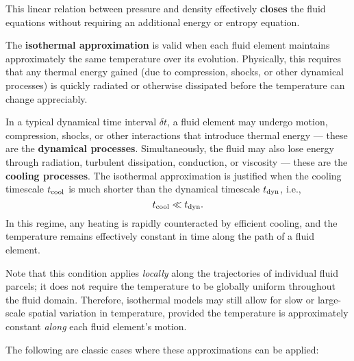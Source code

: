 This linear relation between pressure and density effectively \textbf{closes} the fluid equations without requiring an additional energy or entropy equation.

\vspace{0.3em}
The \textbf{isothermal approximation} is valid when each fluid element maintains approximately the same temperature over its evolution. Physically, this requires that any thermal energy gained (due to compression, shocks, or other dynamical processes) is quickly radiated or otherwise dissipated before the temperature can change appreciably.

\begin{remark}
    In a typical dynamical time interval \( \delta t \), a fluid element may undergo motion, compression, shocks, or other interactions that introduce thermal energy — these are the \textbf{dynamical processes}. Simultaneously, the fluid may also lose energy through radiation, turbulent dissipation, conduction, or viscosity — these are the \textbf{cooling processes}. The isothermal approximation is justified when the cooling timescale \( t_{\rm cool} \) is much shorter than the dynamical timescale \( t_{\rm dyn} \), i.e.,
    \[
    t_{\rm cool} \ll t_{\rm dyn}.
    \]
    In this regime, any heating is rapidly counteracted by efficient cooling, and the temperature remains effectively constant in time along the path of a fluid element.
\end{remark}

Note that this condition applies \textit{locally} along the trajectories of individual fluid parcels; it does not require the temperature to be globally uniform throughout the fluid domain. Therefore, isothermal models may still allow for slow or large-scale spatial variation in temperature, provided the temperature is approximately constant \textit{along} each fluid element's motion.

The following are classic cases where these approximations can be applied:

